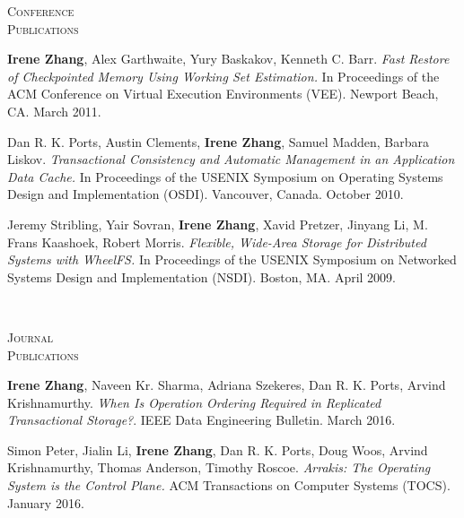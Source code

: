 \documentclass[10pt,times]{report}
\newlength{\sectiongap}
\newlength{\sectioncolwidth}
\newlength{\colgap}
\newlength{\stuffwidth}
\newenvironment{rtable}{
  \begin{minipage}{\textwidth}
  }{
  \end{minipage}
}
\newenvironment{rsection}[1]{
  \begin{minipage}[t]{\sectioncolwidth}
    \textsc{#1}
  \end{minipage}
  \hspace{\colgap}
  \begin{minipage}[t]{\stuffwidth}
  }{
    \removelastskip
  \end{minipage}
  \\[\sectiongap]
}
\begin{document}
\begin{rtable}
\begin{rsection}{Conference\\Publications}
   \textbf{Irene Zhang}, Alex Garthwaite, Yury Baskakov, Kenneth
   C. Barr. \textit{Fast Restore of Checkpointed Memory Using Working
     Set Estimation.}  In Proceedings of the ACM Conference on Virtual
   Execution Environments (VEE). Newport Beach, CA. March 2011.\\\vspace{-0.5em}

   Dan R. K. Ports, Austin Clements, \textbf{Irene Zhang}, Samuel
   Madden, Barbara Liskov. \textit{Transactional Consistency and
     Automatic Management in an Application Data Cache.}  In
   Proceedings of the USENIX Symposium on Operating Systems Design and
   Implementation (OSDI). Vancouver, Canada. October 2010.\\\vspace{-0.5em}

   Jeremy Stribling, Yair Sovran, \textbf{Irene Zhang}, Xavid Pretzer,
   Jinyang Li, M. Frans Kaashoek, Robert Morris. \textit{Flexible,
     Wide-Area Storage for Distributed Systems with WheelFS.}  In
   Proceedings of the USENIX Symposium on Networked Systems Design and
   Implementation (NSDI).  Boston, MA. April 2009. \\\vspace{-0.5em}
  \end{rsection}

  \begin{rsection}{Journal\\Publications}
    \textbf{Irene Zhang}, Naveen Kr. Sharma, Adriana Szekeres, Dan
   R. K. Ports, Arvind Krishnamurthy. \textit{When Is Operation
     Ordering Required in Replicated Transactional Storage?}.  IEEE
   Data Engineering Bulletin. March 2016.\\\vspace{-0.5em}

   Simon Peter, Jialin Li, \textbf{Irene Zhang}, Dan R. K. Ports, Doug
   Woos, Arvind Krishnamurthy, Thomas Anderson, Timothy Roscoe.
   \textit{Arrakis: The Operating System is the Control Plane.}  ACM
   Transactions on Computer Systems (TOCS). January
   2016.\\\vspace{-0.5em}
  \end{rsection}



\end{rtable}
\end{document}

